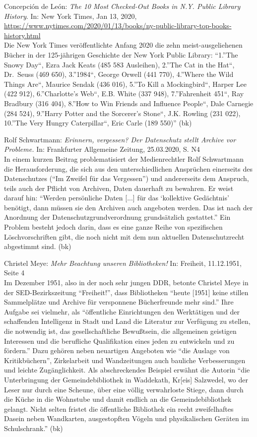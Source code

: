 \documentclass[a4paper,
fontsize=11pt,
oneside,
numbers=noperiodatend,
parskip=half-,
bibliography=totoc,
final
]{scrartcl}
\begin{document}
Concepción de León: \emph{The 10 Most Checked-Out Books in N.Y. Public
Library History}. In: New York Times, Jan 13, 2020,
\url{https://www.nytimes.com/2020/01/13/books/ny-public-library-top-books-history.html}\\
Die New York Times veröffentlichte Anfang 2020 die zehn
meist-ausgeliehenen Bücher in der 125-jährigen Geschichte der New York
Public Library: ``1.''The Snowy Day``, Ezra Jack Keats (485 583
Ausleihen), 2.''The Cat in the Hat``, Dr.~Seuss (469 650), 3.''1984``,
George Orwell (441 770), 4.''Where the Wild Things Are``, Maurice Sendak
(436 016), 5.''To Kill a Mockingbird``, Harper Lee (422 912),
6.''Charlotte's Web``, E.B. White (337 948), 7.''Fahrenheit 451``, Ray
Bradbury (316 404), 8.''How to Win Friends and Influence People``, Dale
Carnegie (284 524), 9.''Harry Potter and the Sorcerer's Stone``, J.K.
Rowling (231 022), 10.''The Very Hungry Caterpillar``, Eric Carle (189
550)'' (bk)

Rolf Schwartmann: \emph{Erinnern, vergessen? Der Datenschutz stellt
Archive vor Probleme.} In: Frankfurter Allgemeine Zeitung, 25.03.2020,
S. N4\\
In einem kurzen Beitrag problematisiert der Medienrechtler Rolf
Schwartmann die Herausforderung, die sich aus den unterschiedlichen
Ansprüchen einerseits des Datenschutzes (``Im Zweifel für das
Vergessen'') und andererseits dem Anspruch, teils auch der Pflicht von
Archiven, Daten dauerhaft zu bewahren. Er weist darauf hin: ``Werden
persönliche Daten {[}...{]} für das `kollektive Gedächtnis' benötigt,
dann müssen sie den Archiven auch angeboten werden. Das ist nach der
Anordnung der Datenschutzgrundverordnung grundsätzlich gestattet.'' Ein
Problem besteht jedoch darin, dass es eine ganze Reihe von spezifischen
Löschvorschriften gibt, die noch nicht mit dem nun aktuellen
Datenschutzrecht abgestimmt sind. (bk)

Christel Meye: \emph{Mehr Beachtung unseren Bibliotheken!} In: Freiheit,
11.12.1951, Seite 4\\
Im Dezember 1951, also in der noch sehr jungen DDR, betonte Christel
Meye in der SED-Bezirkszeitung ``Freiheit!'', dass Bibliotheken ``heute
{[}1951{]} keine stillen Sammelplätze und Archive für versponnene
Bücherfreunde mehr sind.'' Ihre Aufgabe sei vielmehr, als ``öffentliche
Einrichtungen den Werktätigen und der schaffenden Intelligenz in Stadt
und Land die Literatur zur Verfügung zu stellen, die notwendig ist, das
gesellschaftliche Bewußtsein, die allgemeinen geistigen Interessen und
die berufliche Qualifikation eines jeden zu entwickeln und zu fördern.''
Dazu gehören neben neuartigen Angeboten wie ``die Auslage von
Kritikbüchern'', Zirkelarbeit und Wandzeitungen auch bauliche
Verbesserungen und leichte Zugänglichkeit. Als abschreckendes Beispiel
erwähnt die Autorin ``die Unterbringung der Gemeindebibliothek in
Waddekath, Kr{[}eis{]} Salzwedel, wo der Leser nur durch eine Scheune,
über eine völlig verwahrloste Stiege, dann durch die Küche in die
Wohnstube und damit endlich an die Gemeindebibliothek gelangt. Nicht
selten fristet die öffentliche Bibliothek ein recht zweifelhaftes Dasein
neben Wandkarten, ausgestopften Vögeln und physikalischen Geräten im
Schulschrank.'' (bk)
\end{document}
